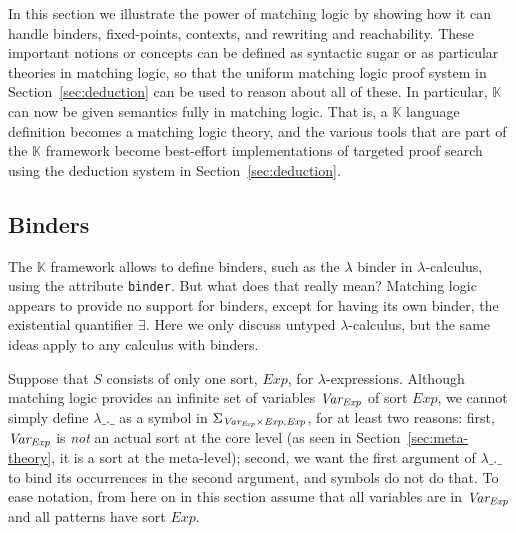 \documentclass[UTF8,11pt]{article}
\theoremstyle{plain}
\theoremstyle{definition}
\theoremstyle{remark}
\newcommand{\K}{\mbox{$\mathbb{K}$}\xspace}
\newcommand{\Exp}{\textit{Exp}}
\begin{document}
In this section we illustrate the power of matching logic by showing how it can
handle binders, fixed-points, contexts, and rewriting and reachability.
These important notions or concepts can be defined as syntactic sugar or as
particular theories in matching logic, so that the uniform matching logic proof
system in Section~\ref{sec:deduction} can be used to reason about all of these.
In particular, \K can now be given semantics fully in matching logic.
That is, a \K language definition becomes a matching logic theory, and the
various tools that are part of the \K framework become best-effort
implementations of targeted proof search using the deduction system in
Section~\ref{sec:deduction}.

\subsection{Binders}
\label{sec:binders}


The \K framework allows to define binders, such as the $\lambda$ binder in
$\lambda$-calculus, using the attribute \texttt{binder}.
But what does that really mean?
Matching logic appears to provide no support for binders, except for having
its own binder, the existential quantifier $\exists$.
Here we only discuss untyped $\lambda$-calculus, but the same ideas apply to
any calculus with binders.

Suppose that $S$ consists of only one sort, $\Exp$, for $\lambda$-expressions.
Although matching logic provides an infinite set of variables $\Var_\Exp$ of
sort $\Exp$, we cannot simply define $\lambda\_.\_$ as a symbol in
$\Sigma_{\Var_\Exp \times \Exp, \Exp}$, for at least two reasons:
first, $\Var_\Exp$ is \emph{not} an actual sort at the core level
(as seen in Section~\ref{sec:meta-theory}, it is a sort at the meta-level);
second, we want the first argument of $\lambda\_.\_$ to bind its occurrences
in the second argument, and symbols do not do that.
To ease notation, from here on in this section assume that all variables
are in $\Var_\Exp$ and all patterns have sort $\Exp$.
\end{document}
